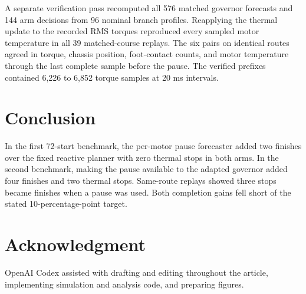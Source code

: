 \documentclass{ieeeaccess}
\begin{document}
A separate verification pass recomputed all 576 matched governor forecasts and 144 arm decisions from 96 nominal branch profiles. Reapplying the thermal update to the recorded RMS torques reproduced every sampled motor temperature in all 39 matched-course replays. The six pairs on identical routes agreed in torque, chassis position, foot-contact counts, and motor temperature through the last complete sample before the pause. The verified prefixes contained 6,226 to 6,852 torque samples at 20 ms intervals.

\section{Conclusion}

In the first 72-start benchmark, the per-motor pause forecaster added two finishes over the fixed reactive planner with zero thermal stops in both arms. In the second benchmark, making the pause available to the adapted governor added four finishes and two thermal stops. Same-route replays showed three stops became finishes when a pause was used. Both completion gains fell short of the stated 10-percentage-point target.

\section*{Acknowledgment}

OpenAI Codex \cite{openai-codex} assisted with drafting and editing throughout the article, implementing simulation and analysis code, and preparing figures.
\end{document}
